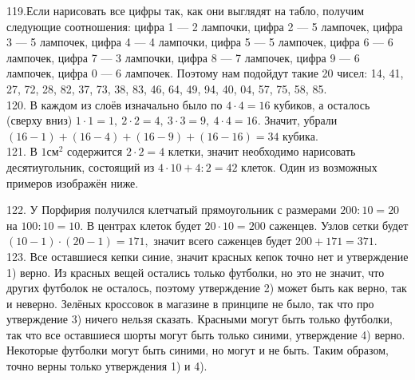 \documentclass[12pt]{article}
\begin{document}
119.Если нарисовать все цифры так, как они выглядят на табло, получим следующие соотношения: цифра 1 --- 2 лампочки, цифра 2 --- 5 лампочек, цифра 3 --- 5 лампочек, цифра 4 --- 4 лампочки, цифра 5 --- 5 лампочек, цифра 6 --- 6 лампочек, цифра 7 --- 3 лампочки, цифра 8 --- 7 лампочек, цифра 9 --- 6 лампочек, цифра 0 --- 6 лампочек. Поэтому нам подойдут такие 20 чисел: 14, 41, 27, 72, 28, 82, 37, 73, 38, 83, 46, 64, 49, 94, 40, 04, 57, 75, 58, 85.\\
120. В каждом из слоёв изначально было по $4\cdot4=16$ кубиков, а осталось (сверху вниз) $1\cdot1=1,\ 2\cdot2=4,\ 3\cdot3=9,\ 4\cdot4=16.$ Значит, убрали $(16-1)+(16-4)+(16-9)+(16-16)=34$ кубика.\\
121. В $1\text{см}^2$ содержится $2\cdot2=4$ клетки, значит необходимо нарисовать десятиугольник, состоящий из $4\cdot10+4:2=42$ клеток. Один из возможных примеров изображён ниже.
\begin{center}
\begin{figure}[ht!]
\end{figure}
\end{center}
122. У Порфирия получился клетчатый прямоугольник с размерами $200:10=20$ на $100:10=10.$ В центрах клеток будет $20\cdot10=200$ саженцев. Узлов сетки будет $(10-1)\cdot(20-1)=171,$ значит всего саженцев будет $200+171=371.$\\
123. Все оставшиеся кепки синие, значит красных кепок точно нет и утверждение 1) верно. Из красных вещей остались только футболки, но это не значит, что других футболок не осталось, поэтому утверждение 2) может быть как верно, так и неверно. Зелёных кроссовок в магазине в принципе не было, так что про утверждение 3) ничего нельзя сказать. Красными могут быть только футболки, так что все оставшиеся шорты могут быть только синими, утверждение 4) верно. Некоторые футболки могут быть синими, но могут и не быть. Таким образом, точно верны только утверждения 1) и 4).\\
\end{document}

